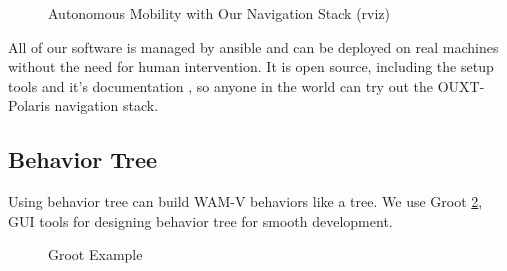 \documentclass[lettersize,journal]{IEEEtran}
\begin{document}
\begin{figure}[H]
    \begin{center}
    \end{center}
    \caption{Autonomous Mobility with Our Navigation Stack (rviz)}
    \label{fig:whill}
\end{figure}

All of our software is managed by ansible and can be deployed on real machines without the need for human intervention.
It is open source, including the setup tools \cite{ouxt_automation} and it's documentation \cite{documentation_software},
so anyone in the world can try out the OUXT-Polaris navigation stack.

\subsection{Behavior Tree}
Using behavior tree can build WAM-V behaviors like a tree.  
We use Groot \ref{fig:Groot}, GUI tools for designing behavior tree for smooth development.

\begin{figure}[H]
  \begin{center}
  \end{center}
  \caption{Groot Example}
  \label{fig:Groot}
\end{figure}
\end{document}
